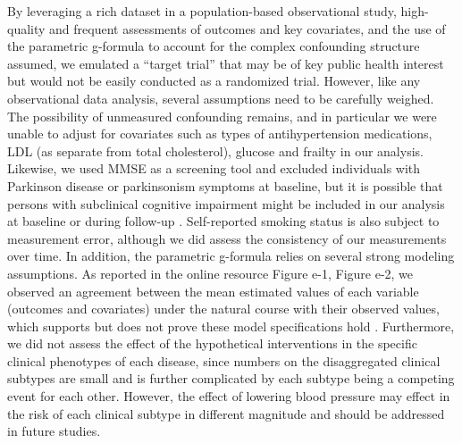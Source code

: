 \documentclass[
]{book}
\begin{document}
By leveraging a rich dataset in a population-based observational study, high-quality and frequent assessments of outcomes and key covariates, and the use of the parametric g-formula to account for the complex confounding structure assumed, we emulated a ``target trial'' that may be of key public health interest but would not be easily conducted as a randomized trial. However, like any observational data analysis, several assumptions need to be carefully weighed. The possibility of unmeasured confounding remains, and in particular we were unable to adjust for covariates such as types of antihypertension medications, LDL (as separate from total cholesterol), glucose and frailty in our analysis. Likewise, we used MMSE as a screening tool and excluded individuals with Parkinson disease or parkinsonism symptoms at baseline, but it is possible that persons with subclinical cognitive impairment might be included in our analysis at baseline or during follow-up \autocite{joe2019}. Self-reported smoking status is also subject to measurement error, although we did assess the consistency of our measurements over time. In addition, the parametric g-formula relies on several strong modeling assumptions. As reported in the online resource Figure e-1, Figure e-2, we observed an agreement between the mean estimated values of each variable (outcomes and covariates) under the natural course with their observed values, which supports but does not prove these model specifications hold \autocite{taubman2009}. Furthermore, we did not assess the effect of the hypothetical interventions in the specific clinical phenotypes of each disease, since numbers on the disaggregated clinical subtypes are small and is further complicated by each subtype being a competing event for each other. However, the effect of lowering blood pressure may effect in the risk of each clinical subtype in different magnitude and should be addressed in future studies.
\end{document}

